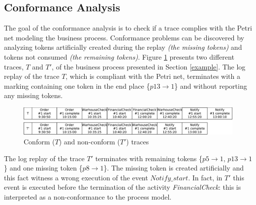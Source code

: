 \documentclass{llncs}
\begin{document}
\subsection{Conformance Analysis}\label{ConformanceAnalysis}
The goal of the conformance analysis is to check if a trace complies with the Petri net modeling the business process. Conformance problems can be discovered by analyzing tokens artificially created during the replay {\itshape (the missing tokens)} and tokens not consumed {\itshape (the remaining tokens)}. Figure \ref{ConfLog}  presents two different traces, $T$ and $T'$, of the business process presented in Section \ref{example}. The log replay of the trace $T$, which is compliant with the Petri net, terminates with a marking containing one token in the end place \{${p13 \rightarrow 1}$\} and without reporting any missing tokens.

\begin{figure}[h]
\centering
\includegraphics[width=0.9\linewidth]
{./items/logConforme.pdf}
\caption{Conform ($T$) and non-conform ($T'$) traces}
\label{ConfLog}
\end{figure}


The log replay of the trace $T'$ terminates with remaining tokens \{$p5 \rightarrow 1$, $p13 \rightarrow 1$\} and one missing token \{${p8 \rightarrow 1}$\}. The missing token is created artificially and this fact witness a wrong execution of the event $Notify\_start$. In fact, in $T'$ this event is executed before the termination of the activity \emph{FinancialCheck}: this is interpreted as a non-conformance to the process model. 

\end{document}
